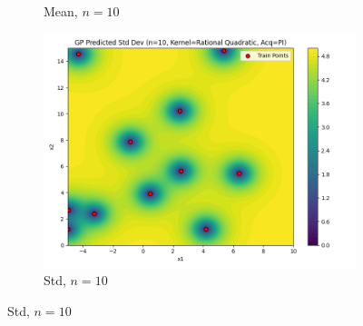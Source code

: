 \documentclass[a4paper,12pt]{article}
\begin{document}
\begin{figure}[H]
\begin{subfigure}{0.3\textwidth}
    \caption{Mean, $n=10$}
\end{subfigure}
\begin{subfigure}{0.3\textwidth}
    \includegraphics[width=\linewidth]{Task-02/images/gp_std_rational_quadratic_n10_PI.png}
    \caption{Std, $n=10$}
\end{subfigure} 


\end{figure}
\end{document}
